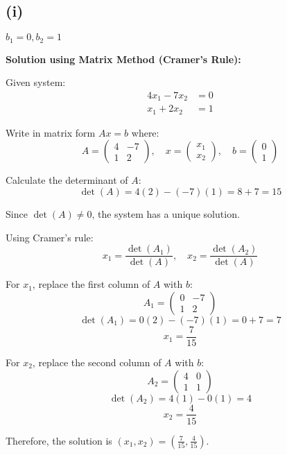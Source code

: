 \subsection*{(i)} $b_1 = 0, b_2 = 1$

\textbf{Solution using Matrix Method (Cramer's Rule):}

Given system:
\begin{align}
4x_1 - 7x_2 &= 0\\
x_1 + 2x_2 &= 1
\end{align}

Write in matrix form $Ax = b$ where:
\[
A = \begin{pmatrix}
4 & -7\\
1 & 2
\end{pmatrix}, \quad
x = \begin{pmatrix}
x_1\\
x_2
\end{pmatrix}, \quad
b = \begin{pmatrix}
0\\
1
\end{pmatrix}
\]

Calculate the determinant of $A$:
\[
\det(A) = 4(2) - (-7)(1) = 8 + 7 = 15
\]

Since $\det(A) \neq 0$, the system has a unique solution.

Using Cramer's rule:
\[
x_1 = \frac{\det(A_1)}{\det(A)}, \quad x_2 = \frac{\det(A_2)}{\det(A)}
\]

For $x_1$, replace the first column of $A$ with $b$:
\[
A_1 = \begin{pmatrix}
0 & -7\\
1 & 2
\end{pmatrix}
\]
\[
\det(A_1) = 0(2) - (-7)(1) = 0 + 7 = 7
\]
\[
x_1 = \frac{7}{15}
\]

For $x_2$, replace the second column of $A$ with $b$:
\[
A_2 = \begin{pmatrix}
4 & 0\\
1 & 1
\end{pmatrix}
\]
\[
\det(A_2) = 4(1) - 0(1) = 4
\]
\[
x_2 = \frac{4}{15}
\]

Therefore, the solution is $\boxed{\left(x_1, x_2\right) = \left(\frac{7}{15}, \frac{4}{15}\right)}$.